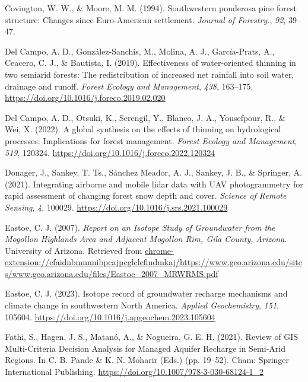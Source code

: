 \documentclass[
]{agujournal2019}
\newlength{\cslhangindent}
\newenvironment{CSLReferences}[2] %
 {\begin{list}{}{%
  \setlength{\itemindent}{0pt}
  \setlength{\leftmargin}{0pt}
  \setlength{\parsep}{0pt}
  \ifodd #1
   \setlength{\leftmargin}{\cslhangindent}
   \setlength{\itemindent}{-1\cslhangindent}
  \fi
  \setlength{\itemsep}{#2\baselineskip}}}
 {\end{list}}
\begin{document}
\begin{CSLReferences}{1}{0}
Covington, W. W., \& Moore, M. M. (1994). Southwestern ponderosa pine
forest structure: Changes since {Euro}-{American} settlement.
\emph{Journal of Forestry.}, \emph{92}, 39--47.

Del Campo, A. D., González-Sanchis, M., Molina, A. J., García-Prats, A.,
Ceacero, C. J., \& Bautista, I. (2019). Effectiveness of water-oriented
thinning in two semiarid forests: {The} redistribution of increased net
rainfall into soil water, drainage and runoff. \emph{Forest Ecology and
Management}, \emph{438}, 163--175.
\url{https://doi.org/10.1016/j.foreco.2019.02.020}

Del Campo, A. D., Otsuki, K., Serengil, Y., Blanco, J. A., Yousefpour,
R., \& Wei, X. (2022). A global synthesis on the effects of thinning on
hydrological processes: {Implications} for forest management.
\emph{Forest Ecology and Management}, \emph{519}, 120324.
\url{https://doi.org/10.1016/j.foreco.2022.120324}

Donager, J., Sankey, T. Ts., Sánchez Meador, A. J., Sankey, J. B., \&
Springer, A. (2021). Integrating airborne and mobile lidar data with
{UAV} photogrammetry for rapid assessment of changing forest snow depth
and cover. \emph{Science of Remote Sensing}, \emph{4}, 100029.
\url{https://doi.org/10.1016/j.srs.2021.100029}

Eastoe, C. J. (2007). \emph{Report on an Isotope Study of Groundwater
from the Mogollon Highlands Area and Adjacent Mogollon Rim, Gila County,
Arizona}. University of Arizona. Retrieved from
\url{chrome-extension://efaidnbmnnnibpcajpcglclefindmkaj/https://www.geo.arizona.edu/sites/www.geo.arizona.edu/files/Eastoe_2007_MRWRMS.pdf}

Eastoe, C. J. (2023). Isotope record of groundwater recharge mechanisms
and climate change in southwestern North America. \emph{Applied
Geochemistry}, \emph{151}, 105604.
\url{https://doi.org/10.1016/j.apgeochem.2023.105604}

Fathi, S., Hagen, J. S., Matanó, A., \& Nogueira, G. E. H. (2021).
Review of GIS Multi-Criteria Decision Analysis for Managed Aquifer
Recharge in Semi-Arid Regions. In C. B. Pande \& K. N. Moharir (Eds.)
(pp. 19--52). Cham: Springer International Publishing.
\url{https://doi.org/10.1007/978-3-030-68124-1_2}


\end{CSLReferences}
\end{document}
